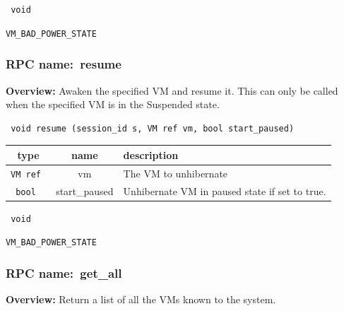 \vspace{0.3cm}

{\tt 
void
}



\vspace{0.3cm}

 {\tt VM\_BAD\_POWER\_STATE}

\vspace{0.6cm}
\subsubsection{RPC name:~resume}

{\bf Overview:} 
Awaken the specified VM and resume it.  This can only be called when the
specified VM is in the Suspended state.

\begin{verbatim} void resume (session_id s, VM ref vm, bool start_paused)\end{verbatim}



 
\vspace{0.3cm}
\begin{tabular}{|c|c|p{7cm}|}
 \hline
{\bf type} & {\bf name} & {\bf description} \\ \hline
{\tt VM ref } & vm & The VM to unhibernate \\ \hline 

{\tt bool } & start\_paused & Unhibernate VM in paused state if set to true. \\ \hline 

\end{tabular}

\vspace{0.3cm}

{\tt 
void
}



\vspace{0.3cm}

 {\tt VM\_BAD\_POWER\_STATE}

\vspace{0.6cm}
\subsubsection{RPC name:~get\_all}

{\bf Overview:} 
Return a list of all the VMs known to the system.

